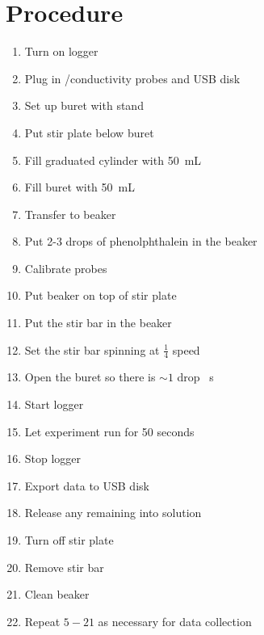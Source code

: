 \documentclass[a4paper]{article}
\newcommand{\pH}{\text{pH}}
\begin{document}
    \section{Procedure}
        \begin{enumerate}
            \item Turn on logger
            \item Plug in \pH/conductivity probes and USB disk
            \item Set up buret with stand
            \item Put stir plate below buret
            \item Fill graduated cylinder with \SI{50}{\mL} 
            \item Fill buret with \SI{50}{\mL} 
            \item Transfer  to beaker
            \item Put 2-3 drops of phenolphthalein in the beaker
            \item Calibrate probes
            \item Put beaker on top of stir plate
            \item Put the stir bar in the beaker
            \item Set the stir bar spinning at $\frac{1}{4}$ speed
            \item Open the buret so there is $\sim1$ drop \si{\per\second}
            \item Start logger
            \item Let experiment run for 50 seconds
            \item Stop logger
            \item Export data to USB disk
            \item Release any remaining  into  solution
            \item Turn off stir plate
            \item Remove stir bar
            \item Clean beaker
            \item Repeat $5-21$ as necessary for data collection
        \end{enumerate}
\end{document}

